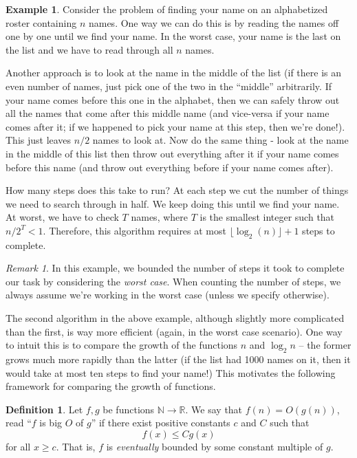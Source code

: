 \documentclass[12pt]{article}
\theoremstyle{plain}
\theoremstyle{definition}
\newtheorem{definition}[theorem]{Definition}
\newtheorem{example}[theorem]{Example}
\theoremstyle{remark}
\newtheorem{remark}[theorem]{Remark}
\newcommand{\N}{\mathbb{N}}
\newcommand{\R}{\mathbb{R}}
\begin{document}
\begin{example}
    Consider the problem of finding your name on an alphabetized roster containing $n$ names.
    One way we can do this is by reading the names off one by one until we find your name.
    In the worst case, your name is the last on the list and we have to read through all $n$ names.

    Another approach is to look at the name in the middle of the list (if there is an even number of names, just pick one of the two in the ``middle'' arbitrarily.
    If your name comes before this one in the alphabet, then we can safely throw out all the names that come after this middle name (and vice-versa if your name comes after it; if we happened to pick your name at this step, then we're done!).
    This just leaves $n/2$ names to look at.
    Now do the same thing - look at the name in the middle of this list then throw out everything after it if your name comes before this name (and throw out everything before if your name comes after).

    How many steps does this take to run?
    At each step we cut the number of things we need to search through in half.
    We keep doing this until we find your name.
    At worst, we have to check $T$ names, where $T$ is the smallest integer such that $n/2^T < 1$.
    Therefore, this algorithm requires at most $\lfloor \log_2(n)\rfloor + 1$ steps to complete.
\end{example}

\begin{remark}
    In this example, we bounded the number of steps it took to complete our task by considering the \emph{worst case}.
    When counting the number of steps, we always assume we're working in the worst case (unless we specify otherwise).
\end{remark}

The second algorithm in the above example, although slightly more complicated than the first,
is way more efficient (again, in the worst case scenario).
One way to intuit this is to compare the growth of the functions $n$ and $\log_2 n$ -- the former grows much more rapidly than the latter (if the list had 1000 names on it, then it would take at most ten steps to find your name!)
This motivates the following framework for comparing the growth of functions.

\begin{definition}
    Let $f, g$ be functions $\N\to \R$.
    We say that $f(n) = O(g(n))$, read ``$f$ is big $O$ of $g$'' if there exist positive constants $c$ and $C$ such that
    \[
        f(x) \leq Cg(x)
    \]
    for all $x \geq c$.
    That is, $f$ is \emph{eventually} bounded by some constant multiple of $g$.
\end{definition}
\end{document}
